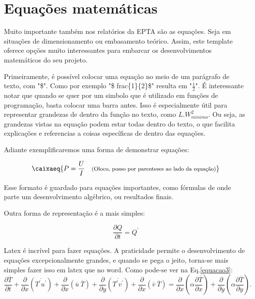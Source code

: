 \chapter{Equações matemáticas}


Muito importante também nos relatórios da EPTA são as equações. Seja em situações de dimensionamento ou embasamento teórico. Assim, este template oferece opções muito interessantes para embarcar os desenvolvimentos matemáticos do seu projeto. 

Primeiramente, é possível colocar uma equação no meio de um parágrafo de texto, com "\$". Como por exemplo "\$ frac\{1\}\{2\}\$" resulta em "$\frac{1}{2}$". É interessante notar que quando se quer por um simbolo que é utilizado em funções de programação, basta colocar uma barra antes. Isso é especialmente útil para representar grandezas de dentro da função no texto, como $L.W_{minimo}^2$. Ou seja, as grandezas vistas na equação podem estar todas dentro do texto, o que facilita explicações e referencias a coisas específicas de dentro das equações.

Adiante exemplificaremos uma forma de demonstrar equações:

\begin{equation}\label{equacao1}
	\caixaeq{                            %
		P=\frac{U}{I}                    %
		\quad                            %
		\text{\footnotesize(Oloco, posso por parenteses ao lado da equação)}    %
	} 
\end{equation}

Esse formato é guardado para equações importantes, como fórmulas de onde parte um desenvolvimento algébrico, ou resultados finais.

Outra forma de representação é a mais simples:

\begin{equation}\label{equacao2}
	\frac{\partial Q}{\partial t} = Q^\prime
\end{equation}

Latex é incrível para fazer equações. A praticidade permite o desenvolvimento de equações excepcionalmente grandes, e quando se pega o jeito, torna-se mais simples fazer isso em latex que no word. Como pode-se ver na Eq.\ref{equacao3}:
\begin{equation}\label{equacao3}
	\frac{\partial \overline{T}}{\partial t} +\frac{\partial{}}{\partial{x}} \left(\overline{T^\prime  u^\prime}\right) + \frac{\partial{}}{\partial{x}}\left(\overline{u} \ \overline{T}\right)     + 
	\frac{\partial{}}{\partial{y}} \left(\overline{T^\prime v^\prime}\right) + \frac{\partial{}}{\partial{x}}\left(\overline{v} \ \overline{T}\right) 
	=
	{\frac{\partial{}}{\partial{x}}} \left(\alpha {\frac{\partial{\overline{T}}}{\partial{x}}} \right) +
	{\frac{\partial{}}{\partial{y}}} \left(\alpha {\frac{\partial{\overline{T}}}{\partial{y}}} \right) .
\end{equation}

